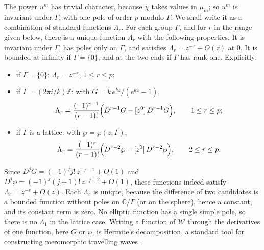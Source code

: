 \documentclass[11pt]{article}
\theoremstyle{definition}
\theoremstyle{remark}
\numberwithin{equation}{section}
\newcommand{\CC}{\mathbb C}
\newcommand{\ZZ}{\mathbb Z}
\newcommand{\Wclass}{\mathcal W}
\begin{document}
The power \(u^m\) has trivial character, because \(\chi\) takes values
in \(\mu_m\); so \(u^m\) is invariant under \(\Gamma\), with one pole
of order \(p\) modulo \(\Gamma\). We shall write it as a combination
of standard functions \(\Lambda_r\). For each group \(\Gamma\), and for
\(r\) in the range given below, there is a unique function
\(\Lambda_r\) with the following properties. It is invariant under
\(\Gamma\), has poles only on \(\Gamma\), and satisfies
\(\Lambda_r=z^{-r}+O(z)\) at \(0\). It is bounded at infinity if
\(\Gamma=\{0\}\), and at the two ends if \(\Gamma\) has rank one.
Explicitly:
\begin{itemize}
\item if \(\Gamma=\{0\}\): \(\Lambda_r=z^{-r}\), \(1\le r\le p\);
\item if \(\Gamma=(2\pi i/k)\ZZ\): with \(G=k\,e^{kz}/(e^{kz}-1)\),
\[
 \Lambda_r=\frac{(-1)^{r-1}}{(r-1)!}
 \Bigl(D^{r-1}G-[z^0]\,D^{r-1}G\Bigr),\qquad 1\le r\le p;
\]
\item if \(\Gamma\) is a lattice: with \(\wp=\wp(z;\Gamma)\),
\[
 \Lambda_r=\frac{(-1)^{r}}{(r-1)!}
 \Bigl(D^{r-2}\wp-[z^0]\,D^{r-2}\wp\Bigr),\qquad 2\le r\le p.
\]
\end{itemize}
Since \(D^jG=(-1)^jj!\,z^{-j-1}+O(1)\) and
\(D^j\wp=(-1)^j(j+1)!\,z^{-j-2}+O(1)\), these functions indeed satisfy
\(\Lambda_r=z^{-r}+O(z)\). Each \(\Lambda_r\) is unique, because the
difference of two candidates is a bounded function without poles on
\(\CC/\Gamma\) (or on the sphere), hence a constant, and its constant
term is zero. No elliptic function has a single simple pole, so there
is no \(\Lambda_1\) in the lattice case. Writing a function of
\(\Wclass\) through the derivatives of one function, here \(G\) or
\(\wp\), is Hermite's decomposition, a standard tool for constructing
meromorphic travelling waves
\citep{MusetteConte2003,DeminaKudryashov2011,DeminaKudryashovElliptic2011,DeminaKudryashovKawahara2010}.
\end{document}
